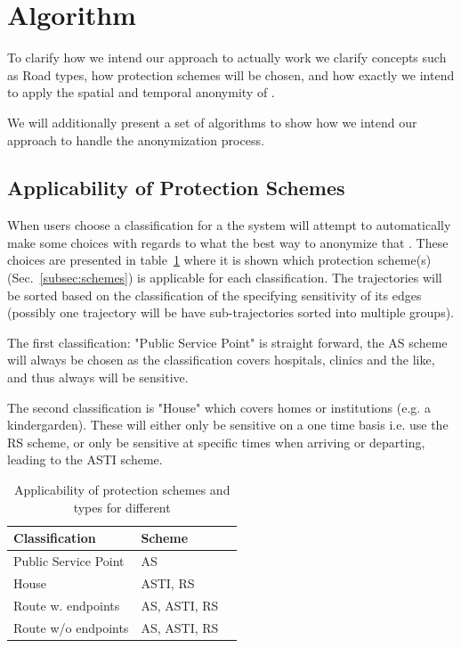 \section{Algorithm}\label{sec:algorithm}

To clarify how we intend our approach to actually work we clarify concepts such as Road types, how protection schemes will be chosen, and how exactly we intend to apply the spatial and temporal anonymity of \tanonns. 

We will additionally present a set of algorithms to show how we intend our approach to handle the anonymization process.



\subsection{Applicability of Protection Schemes}

When users choose a classification for a \poi the system will attempt to automatically make some choices with regards to what the best way to anonymize that \poins. These choices are presented in table~\ref{tab:poitype} where it is shown which protection scheme(s) (Sec.~\ref{subsec:schemes}) is applicable for each classification. The trajectories will be sorted based on the classification of the \poi specifying sensitivity of its edges (possibly one trajectory will be have sub-trajectories sorted into multiple groups).

The first classification: "Public Service Point" is straight forward, the \ac{AS} scheme will always be chosen as the classification covers hospitals, clinics and the like, and thus always will be sensitive. 

The second classification is "House" which covers homes or institutions (e.g. a kindergarden). These will either only be sensitive on a one time basis i.e. use the \ac{RS} scheme, or only be sensitive at specific times when arriving or departing, leading to the \ac{ASTI} scheme.

\begin{table}[Htb]
\center
\begin{tabular}{|l|l|l|}
\hline
\bf Classification	& \bf Scheme \\\hline		
Public Service Point	& \ac{AS} \\\hline
House			& \ac{ASTI}, \ac{RS} \\\hline
Route w. endpoints	& \ac{AS}, \ac{ASTI}, \ac{RS}  \\\hline
Route w/o endpoints	& \ac{AS}, \ac{ASTI}, \ac{RS}  \\\hline

\end{tabular}
\caption{Applicability of protection schemes and types for different \poisns} 
\label{tab:poitype}
\end{table}



